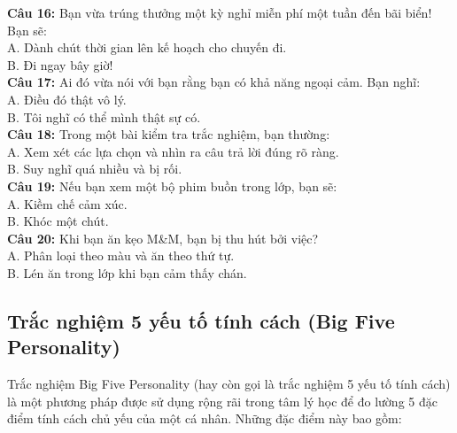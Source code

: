 \begin{multicols}{2}
\textbf{Câu 16:} Bạn vừa trúng thưởng một kỳ nghỉ miễn phí một tuần đến bãi biển! Bạn sẽ: \\
A. Dành chút thời gian lên kế hoạch cho chuyến đi. \\
B. Đi ngay bây giờ! \\

\textbf{Câu 17:} Ai đó vừa nói với bạn rằng bạn có khả năng ngoại cảm. Bạn nghĩ: \\
A. Điều đó thật vô lý. \\
B. Tôi nghĩ có thể mình thật sự có. \\

\textbf{Câu 18:} Trong một bài kiểm tra trắc nghiệm, bạn thường: \\
A. Xem xét các lựa chọn và nhìn ra câu trả lời đúng rõ ràng. \\
B. Suy nghĩ quá nhiều và bị rối. \\

\textbf{Câu 19:} Nếu bạn xem một bộ phim buồn trong lớp, bạn sẽ: \\
A. Kiềm chế cảm xúc. \\
B. Khóc một chút. \\

\textbf{Câu 20:} Khi bạn ăn kẹo M\&M, bạn bị thu hút bởi việc? \\
A. Phân loại theo màu và ăn theo thứ tự. \\
B. Lén ăn trong lớp khi bạn cảm thấy chán. \\

\end{multicols}

\subsection{Trắc nghiệm 5 yếu tố tính cách (Big Five Personality)}

Trắc nghiệm Big Five Personality (hay còn gọi là trắc nghiệm 5 yếu tố tính cách) là một phương pháp được sử dụng rộng rãi trong tâm lý học để đo lường 5 đặc điểm tính cách chủ yếu của một cá nhân. Những đặc điểm này bao gồm:

